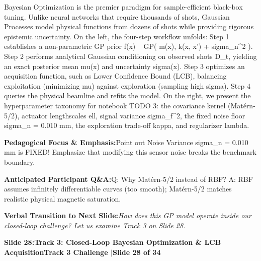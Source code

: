 \documentclass[11pt,a4paper]{article}
\begin{document}
\begin{tcolorbox}[colback=white,colframe=primaryblue,title={\footnotesize\bfseries\color{white}Spoken Presenter Script},fontupper=\small,left=6pt,right=6pt,top=3pt,bottom=3pt,boxrule=0.8pt,arc=2.5pt]
Bayesian Optimization is the premier paradigm for sample-efficient black-box tuning. Unlike neural networks that require thousands of shots, Gaussian Processes model physical functions from dozens of shots while providing rigorous epistemic uncertainty. On the left, the four-step workflow unfolds: Step 1 establishes a non-parametric GP prior f(x) ~ GP( m(x), k(x, x') + sigma\_n\textasciicircum{}2 ). Step 2 performs analytical Gaussian conditioning on observed shots D\_t, yielding an exact posterior mean mu(x) and uncertainty sigma(x). Step 3 optimizes an acquisition function, such as Lower Confidence Bound (LCB), balancing exploitation (minimizing mu) against exploration (sampling high sigma). Step 4 queries the physical beamline and refits the model. On the right, we present the hyperparameter taxonomy for notebook TODO 3: the covariance kernel (Matérn-5/2), actuator lengthscales ell, signal variance sigma\_f\textasciicircum{}2, the fixed noise floor sigma\_n = 0.010 mm, the exploration trade-off kappa, and regularizer lambda.
\end{tcolorbox}
\vspace{0.2em}
\begin{tcolorbox}[colback=lightbg,colframe=bordergray,left=6pt,right=6pt,top=3pt,bottom=3pt,boxrule=0.6pt,arc=2.5pt]
\small
\noindent\textbf{\color{navy}Pedagogical Focus \& Emphasis:}\enspace Point out Noise Variance sigma\_n = 0.010 mm is FIXED! Emphasize that modifying this sensor noise breaks the benchmark boundary.\par\vspace{0.3em}
\noindent\textbf{\color{successgreen}Anticipated Participant Q\&A:}\enspace Q: Why Matérn-5/2 instead of RBF? A: RBF assumes infinitely differentiable curves (too smooth); Matérn-5/2 matches realistic physical magnetic saturation.\par\vspace{0.3em}
\noindent\textbf{\color{accent}Verbal Transition to Next Slide:}\enspace \emph{How does this GP model operate inside our closed-loop challenge? Let us examine Track 3 on Slide 28.}
\end{tcolorbox}
\clearpage
\hypertarget{slide.28}{}
{}
\noindent\begin{tcolorbox}[colback=navy,colframe=navy,left=6pt,right=6pt,top=3pt,bottom=3pt,boxrule=0pt,arc=2pt]
{\large\bfseries\color{white}Slide 28:\enspace Track 3: Closed-Loop Bayesian Optimization \& LCB Acquisition}\hfill{\footnotesize\bfseries\color{white!85!lightbg}Track 3 Challenge \enspace$|$\enspace Slide 28 of 34}
\end{tcolorbox}
\end{document}
